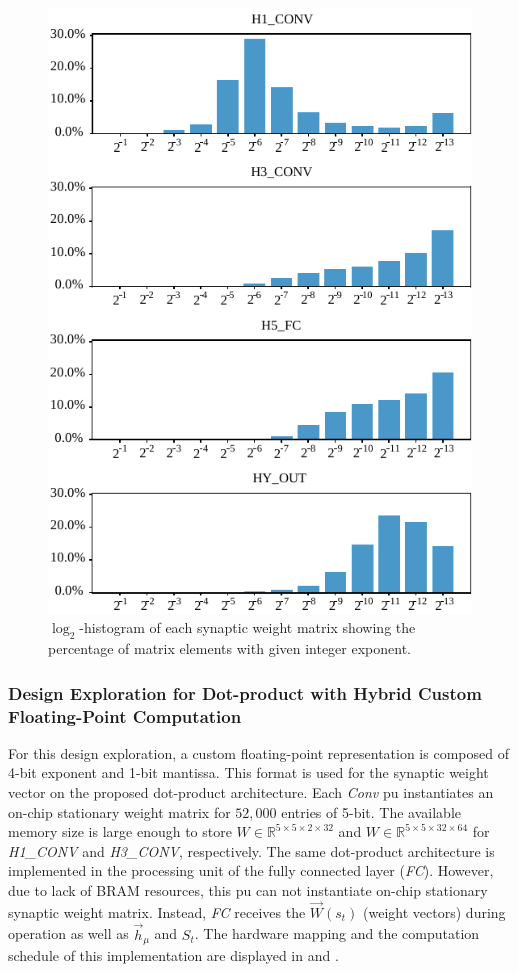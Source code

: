 \begin{figure}[b!]
	\centering
	\includegraphics[width=0.5\columnwidth]{./chapters/sbs_accelerator/figures/log2_histogram.pdf}
	\caption{$\log_2$-histogram of each synaptic weight matrix showing the percentage of matrix elements with given integer exponent.}\label{fig:log2histogram}
\end{figure}

\subsubsection{Design Exploration for Dot-product with Hybrid Custom Floating-Point Computation}
For this design exploration, a custom floating-point representation is composed of 4-bit exponent and 1-bit mantissa. This format is used for the synaptic weight vector on the proposed dot-product architecture. Each \emph{Conv} \gls{pu} instantiates an on-chip stationary weight matrix for $52,000$ entries of 5-bit. The available memory size is large enough to store $W\in\mathbb{R}^{5\times 5\times 2\times 32}$ and $W\in\mathbb{R}^{5\times 5\times 32\times 64}$ for \emph{H1\_CONV} and \emph{H3\_CONV}, respectively. The same dot-product architecture is implemented in the processing unit of the fully connected layer (\emph{FC}). However, due to lack of BRAM resources, this \gls{pu} can not instantiate on-chip stationary synaptic weight matrix. Instead, \emph{FC} receives the $\vec{W}(s_t)$ (weight vectors) during operation as well as $\vec{h}_\mu$ and $S_t$. The hardware mapping and the computation schedule of this implementation are displayed in  and .


